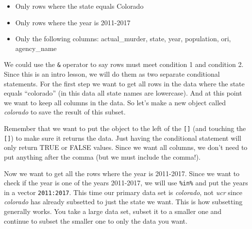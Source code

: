 \documentclass[
]{krantz}
\makeatletter
\newenvironment{Shaded}{\begin{snugshade}}{\end{snugshade}}
\newcommand{\DecValTok}[1]{\textcolor[rgb]{0.06,0.06,0.06}{#1}}
\newcommand{\NormalTok}[1]{#1}
\newcommand{\OtherTok}[1]{\textcolor[rgb]{0.37,0.37,0.37}{#1}}
\newcommand{\SpecialCharTok}[1]{\textcolor[rgb]{0,0,0}{#1}}
\newcommand{\StringTok}[1]{\textcolor[rgb]{0.5,0.5,0.5}{#1}}
\providecommand{\tightlist}{%
  \setlength{\itemsep}{0pt}\setlength{\parskip}{0pt}}
\newenvironment{kframe}{%
\medskip{}
\setlength{\fboxsep}{.8em}
 \def\at@end@of@kframe{}%
 \ifinner\ifhmode%
  \def\at@end@of@kframe{\end{minipage}}%
  \begin{minipage}{\columnwidth}%
 \fi\fi%
 \def\FrameCommand##1{\hskip\@totalleftmargin \hskip-\fboxsep
 \colorbox{shadecolor}{##1}\hskip-\fboxsep
     \hskip-\linewidth \hskip-\@totalleftmargin \hskip\columnwidth}%
 \MakeFramed {\advance\hsize-\width
   \@totalleftmargin\z@ \linewidth\hsize
   \@setminipage}}%
 {\par\unskip\endMakeFramed%
 \at@end@of@kframe}
\renewenvironment{Shaded}{\begin{kframe}}{\end{kframe}}
\makeatother
\begin{document}
\begin{itemize}
\tightlist
\item
  Only rows where the state equals Colorado
\item
  Only rows where the year is 2011-2017
\item
  Only the following columns: actual\_murder, state, year, population, ori, agency\_name
\end{itemize}

We could use the \texttt{\&} operator to say rows must meet condition 1 and condition 2. Since this is an intro lesson, we will do them as two separate conditional statements. For the first step we want to get all rows in the data where the state equals ``colorado'' (in this data all state names are lowercase). And at this point we want to keep all columns in the data. So let's make a new object called \emph{colorado} to save the result of this subset.

Remember that we want to put the object to the left of the \texttt{{[}{]}} (and touching the \texttt{{[}{]}}) to make sure it returns the data. Just having the conditional statement will only return TRUE or FALSE values. Since we want all columns, we don't need to put anything after the comma (but we must include the comma!).

\begin{Shaded}
\end{Shaded}

Now we want to get all the rows where the year is 2011-2017. Since we want to check if the year is one of the years 2011-2017, we will use \texttt{\%in\%} and put the years in a vector \texttt{2011:2017}. This time our primary data set is \emph{colorado}, not \emph{ucr} since \emph{colorado} has already subsetted to just the state we want. This is how subsetting generally works. You take a large data set, subset it to a smaller one and continue to subset the smaller one to only the data you want.

\begin{Shaded}
\end{Shaded}
\end{document}
